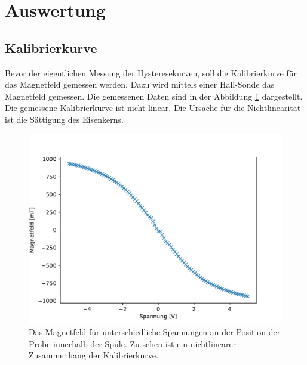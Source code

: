 \section{Auswertung}
\subsection{Kalibrierkurve}
Bevor der eigentlichen Messung der Hysteresekurven, soll die Kalibrierkurve für das Magnetfeld gemessen werden. Dazu wird mittels einer Hall-Sonde das Magnetfeld gemessen. Die gemessenen Daten sind in der Abbildung \ref{fig:Kalibrierung} dargestellt. Die gemessene Kalibrierkurve ist nicht linear. Die Ursache für die Nichtlinearität ist die Sättigung des Eisenkerns. 
\begin{figure}[H]
\centering
\includegraphics[scale=0.8]{../Messdaten/auswertung/Kalibrierung.pdf}
\caption{ Das Magnetfeld für unterschiedliche Spannungen an der Position der Probe innerhalb der Spule. Zu sehen ist ein nichtlinearer Zusammenhang der Kalibrierkurve. }
\label{fig:Kalibrierung}
\end{figure}


